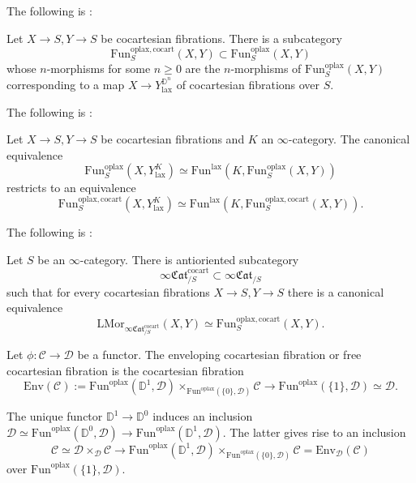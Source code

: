 \documentclass[10pt,oneside]{article}
\numberwithin{equation}{section} %
\numberwithin{figure}{section} %
\theoremstyle{plain}
\theoremstyle{definition}
\newcommand{\bD}{{\mathbb D}}
\newcommand{\mC}{{\mathcal C}}
\newcommand{\mD}{{\mathcal D}}
\renewcommand{\L}{{\mathrm L}}
\newcommand{\Env}{{\mathrm{Env}}}
\newcommand{\Fun}{\mathrm{Fun}}
\newcommand{\cocart}{{\mathrm{cocart}}}
\newcommand{\lax}{{\mathrm{lax}}}
\newcommand{\oplax}{{\mathrm{oplax}}}
\newcommand{\Mor}{{\mathrm{Mor}}}
\begin{document}
The following is \cite[Proposition 5.1.4.]{gepner2026fibrations}:

\begin{lemma}\label{repren}
Let $X \to S, Y \to S$ be cocartesian fibrations.
There is a subcategory $$ \Fun^{\oplax, \cocart}_S(X,Y) \subset \Fun^\oplax_S(X,Y)$$ whose $n$-morphisms for some $n \geq 0$ are the $n$-morphisms of $ \Fun^\oplax_S(X,Y)$ corresponding to a map $X \to Y^{\bD^n}_\lax $ of cocartesian fibrations over $S.$


\end{lemma}

The following is \cite[Lemma 5.1.5.]{gepner2026fibrations}:
 
\begin{lemma}\label{cotensol}



Let $X \to S, Y \to S$ be cocartesian fibrations and $K$ an $\infty$-category. The canonical equivalence
$$ \Fun^\oplax_S(X,Y^K_\lax) \simeq \Fun^\lax(K,\Fun^\oplax_S(X,Y)) $$
restricts to an equivalence
$$ \Fun^{\oplax, \cocart}_S(X,Y^K_\lax) \simeq \Fun^\lax(K,\Fun^{\oplax, \cocart}_S(X,Y)). $$
    
\end{lemma}


The following is \cite[Theorem 5.1.8.]{gepner2026fibrations}:

\begin{theorem}

Let $S$ be an $\infty$-category.
There is antioriented subcategory 
$$ \infty\mathfrak{Cat}^\cocart_{/S} \subset \infty\mathfrak{Cat}_{/S}$$
such that for every cocartesian fibrations $X \to S, Y \to S$
there is a canonical equivalence
$$ \L\Mor_{\infty\mathfrak{Cat}^\cocart_{/S}}(X,Y) \simeq \Fun^{\oplax,\cocart}_S(X,Y).$$

\end{theorem}



\begin{definition}
Let $\phi: \mC \to \mD $ be a functor.
The enveloping cocartesian fibration or free cocartesian fibration
is the cocartesian fibration $$\Env(\mC):=\Fun^\oplax(\bD^1,\mD) \times_{\Fun^\oplax(\{0\},\mD)} \mC \to \Fun^\oplax(\{1\},\mD)\simeq \mD.$$

\end{definition}

\begin{remark}

The unique functor $\bD^1 \to \bD^0$ induces an inclusion
$ \mD \simeq \Fun^\oplax(\bD^0,\mD) \to \Fun^\oplax(\bD^1,\mD)$.
The latter gives rise to an inclusion
$$ \mC \simeq \mD \times_{\mD} \mC \to \Fun^\oplax(\bD^1,\mD) \times_{\Fun^\oplax(\{0\},\mD)} \mC = \Env_\mD(\mC) $$
over $\Fun^\oplax(\{1\},\mD).$

\end{remark}
\end{document}
